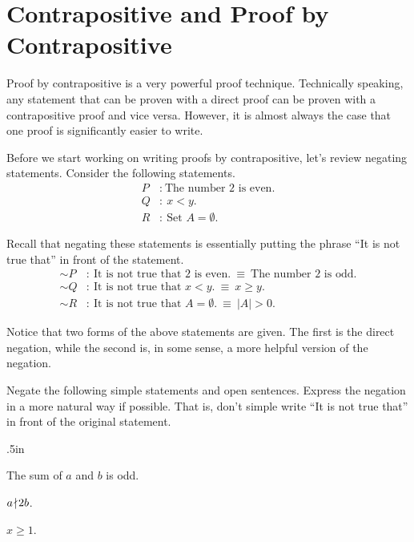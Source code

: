 \chapter{Contrapositive and Proof by Contrapositive}

Proof by contrapositive is a very powerful proof technique.  Technically speaking, any statement that can be proven with a direct proof can be proven with a contrapositive proof and vice versa.  However, it is almost always the case that one proof is significantly easier to write. 

\begin{center}
\end{center}

\noindent Before we start working on writing proofs by contrapositive, let's review negating statements.  Consider the following statements.
	\begin{align*}
	P &: \ \mbox{The number 2 is even.}\\
	Q &: \ \mbox{$x<y$.}\\
	R &: \ \mbox{Set $A= \emptyset$.}
	\end{align*}
	
Recall that negating these statements is essentially putting the phrase ``It is not true that'' in front of the statement.
	\begin{align*}
	\sim P &: \ \mbox{It is not true that 2 is even.} \ \equiv \ \mbox{The number 2 is odd.}\\
	\sim Q &: \ \mbox{It is not true that $x<y$.} \ \equiv \ \mbox{$x \geq y$.}\\
	\sim R &: \ \mbox{It is not true that $A = \emptyset$.} \ \equiv \ \mbox{$|A|>0$.}
	\end{align*}

Notice that two forms of the above statements are given.  The first is the direct negation, while the second is, in some sense, a more helpful version of the negation.

\begin{question}
	\item Negate the following simple statements and open sentences.  Express the negation in a more natural way if possible.  That is, don't simple write ``It is not true that'' in front of the original statement.
	\begin{qpart} \itemsep.5in
	\item The sum of $a$ and $b$ is odd.
	\item $a \! \nmid \! 2b$.
	\item $x \geq 1$.
	\vspace{.5in}
	\end{qpart}
\end{question}

